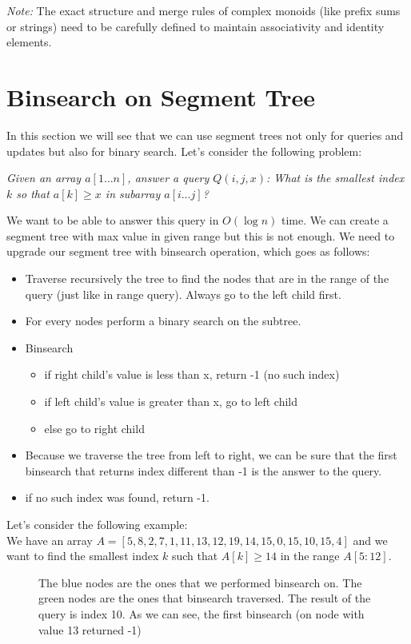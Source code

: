\documentclass[11pt]{article}
\begin{document}
\textit{Note:} The exact structure and merge rules of complex monoids (like prefix sums or strings) need to be carefully defined to maintain associativity and identity elements.


\section{Binsearch on Segment Tree}
In this section we will see that we can use segment trees not only for queries and updates but also for
binary search. Let's consider the following problem:
\begin{center}
    \textit{Given an array $a[1 \ldots n]$, answer a query $Q(i, j, x)$: What is the smallest index $k$ so that $a[k] \geq x$ in subarray  $a[i \ldots j]$?}\\[1ex]
\end{center}

We want to be able to answer this query in \(O(\log{n})\) time. We can create 
a segment tree with max value in given range but this is not enough. We need to upgrade our segment tree
with binsearch operation, which goes as follows:
\begin{itemize}
    \item Traverse recursively the tree to find the nodes that are in the range of the query (just like in range query). Always go to the left child first.
    \item For every nodes perform a binary search on the subtree.
    \item Binsearch 
        \begin{itemize}
            \item if right child's value is less than x, return -1 (no such index)
            \item if left child's value is greater than x, go to left child
            \item else go to right child
        \end{itemize}
    \item Because we traverse the tree from left to right, we can be sure that the first binsearch that returns index different than -1 is the answer to the query.
    \item if no such index was found, return -1.
\end{itemize}


\FloatBarrier
Let's consider the following example: \\
We have an array \(A = [5, 8, 2, 7, 1, 11, 13, 12, 19, 14, 15, 0, 15, 10, 15, 4]\) and we want to find the smallest index \(k\) such that \(A[k] \geq 14\) in the range \(A[5:12]\).

\begin{figure}[H]
    \centering
    
    \caption{The blue nodes are the ones that we performed binsearch on. The green nodes are the ones that binsearch traversed. The result of the query is index 10. As we can see, the first binsearch (on node with value 13 returned -1)}
    \label{fig:segment_tree_1}
\end{figure}
\end{document}
